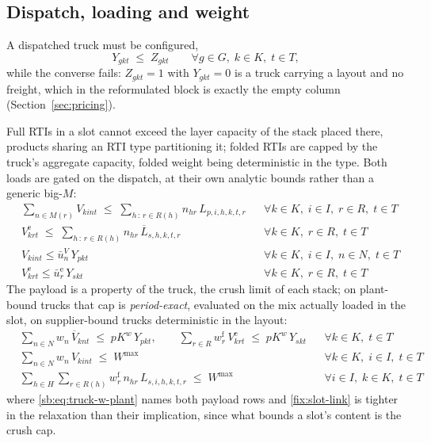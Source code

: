 \subsection{Dispatch, loading and weight}

A dispatched truck must be configured,
\begin{equation}
Y_{gkt}\;\le\;Z_{gkt}\qquad\forall g\in G,\;k\in K,\;t\in T,
\label{sb:eq:lc-active}
\end{equation}
while the converse fails: $Z_{gkt}=1$ with $Y_{gkt}=0$ is a truck
carrying a layout and no freight, which in the reformulated block is
exactly the empty column (Section~\ref{sec:pricing}).

Full RTIs in a slot cannot exceed the layer capacity of the stack
placed there, products sharing an RTI type partitioning it; folded RTIs
are capped by the truck's aggregate capacity, folded weight being
deterministic in the type. Both loads are gated on the dispatch, at
their own analytic bounds rather than a generic big-$M$:
\begin{align}
  & \sum_{n\in M(r)} V_{kint}
      \;\le\;\sum_{h\,:\,r\in R(h)} n_{hr}\,L_{p,i,h,k,t,r}
    && \forall k\in K,\; i\in I,\; r\in R,\; t\in T
    \label{sb:eq:slot-cap}\\
  & V^{\mathrm{e}}_{krt}
      \;\le\;\sum_{h\,:\,r\in R(h)} n_{hr}\,\overline{L}_{s,h,k,t,r}
    && \forall k\in K,\; r\in R,\; t\in T
    \label{sb:eq:empty-cap}\\
  & V_{kint}\le \bar u^{V}_{n}\,Y_{pkt}
    && \forall k\in K,\; i\in I,\; n\in N,\; t\in T
    \label{fix:slot-link}\\
  & V^{\mathrm{e}}_{krt}\le \bar u^{\mathrm{e}}_{r}\,Y_{skt}
    && \forall k\in K,\; r\in R,\; t\in T
    \label{fix:empty-link}
\end{align}
The payload is a property of the truck, the crush limit of each stack;
on plant-bound trucks that cap is \emph{period-exact}, evaluated on the
mix actually loaded in the slot, on supplier-bound trucks deterministic
in the layout:
\begin{align}
  & \sum_{n\in N} w_{n}\,\overline{V}_{knt}\;\le\;pK^{w}\,Y_{pkt},
  \qquad
    \sum_{r\in R} w^{\mathrm{f}}_{r}\,V^{\mathrm{e}}_{krt}
      \;\le\;pK^{w}\,Y_{skt}
    && \forall k\in K,\; t\in T
    \label{sb:eq:truck-w-plant}\\
  & \sum_{n\in N} w_{n}\,V_{kint}\;\le\;W^{\max}
    && \forall k\in K,\; i\in I,\; t\in T
    \label{sb:eq:stack-w-plant}\\
  & \sum_{h\in H}\sum_{r\in R(h)}
      w^{\mathrm{f}}_{r}\,n_{hr}\,L_{s,i,h,k,t,r}\;\le\;W^{\max}
    && \forall i\in I,\; k\in K,\; t\in T
    \label{sb:eq:stack-w-sup}
\end{align}
where \eqref{sb:eq:truck-w-plant} names both payload rows and
\eqref{fix:slot-link} is tighter in the relaxation than their
implication, since what bounds a slot's content is the crush cap.

